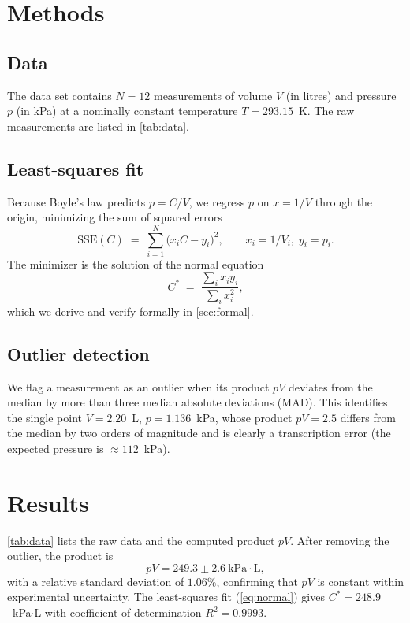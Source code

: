 \documentclass{article}
\theoremstyle{plain}
\theoremstyle{definition}
\theoremstyle{remark}
\begin{document}
\section{Methods}
\label{sec:methods}

\subsection{Data}
The data set contains $N = 12$ measurements of volume $V$ (in litres) and
pressure $p$ (in kPa) at a nominally constant temperature $T = 293.15$~K. The
raw measurements are listed in \cref{tab:data}.

\subsection{Least-squares fit}
Because Boyle's law predicts $p = C/V$, we regress $p$ on $x = 1/V$ through the
origin, minimizing the sum of squared errors
\begin{equation}
  \mathrm{SSE}(C) \;=\; \sum_{i=1}^{N} \bigl(x_i C - y_i\bigr)^2,
  \qquad x_i = 1/V_i,\; y_i = p_i .
  \label{eq:sse}
\end{equation}
The minimizer is the solution of the normal equation
\begin{equation}
  C^* \;=\; \frac{\sum_i x_i y_i}{\sum_i x_i^2},
  \label{eq:normal}
\end{equation}
which we derive and verify formally in \cref{sec:formal}.

\subsection{Outlier detection}
We flag a measurement as an outlier when its product $pV$ deviates from the
median by more than three median absolute deviations (MAD). This identifies
the single point $V = 2.20$~L, $p = 1.136$~kPa, whose product $pV = 2.5$
differs from the median by two orders of magnitude and is clearly a
transcription error (the expected pressure is $\approx 112$~kPa).

\section{Results}

\cref{tab:data} lists the raw data and the computed product $pV$. After
removing the outlier, the product is
\[
  pV = 249.3 \pm 2.6~\mathrm{kPa\cdot L},
\]
with a relative standard deviation of $1.06\%$, confirming that $pV$ is
constant within experimental uncertainty. The least-squares fit
(\cref{eq:normal}) gives $C^* = 248.9$~kPa$\cdot$L with coefficient of
determination $R^2 = 0.9993$.
\end{document}
